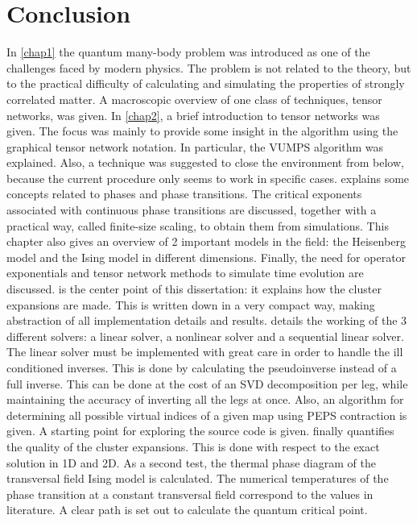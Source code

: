 \section{Conclusion}

In \cref{chap1} the quantum many-body problem was introduced as one of the challenges faced by modern physics. The problem is not related to the theory, but to the practical difficulty of calculating and simulating the properties of strongly correlated matter. A macroscopic overview of one class of techniques, tensor networks, was given.
In \cref{chap2}, a brief introduction to tensor networks was given. The focus was mainly to provide some insight in the algorithm using the graphical tensor network notation. In particular, the VUMPS algorithm was explained. Also, a technique was suggested to close the environment from below, because the current procedure only seems to work in specific cases.
 explains some concepts related to phases and phase transitions. The critical exponents associated with continuous phase transitions are discussed, together with a practical way, called finite-size scaling, to obtain them from simulations. This chapter also gives an overview of 2 important models in the field: the Heisenberg model and the Ising model in different dimensions. Finally, the need for operator exponentials and tensor network methods to simulate time evolution are discussed.
 is the center point of this dissertation: it explains how the cluster expansions are made. This is written down in a very compact way, making abstraction of all implementation details and results.
 details the working of the 3 different solvers: a linear solver, a nonlinear solver and a sequential linear solver. The linear solver must be implemented with great care in order to handle the ill conditioned inverses. This is done by calculating the pseudoinverse instead of a full inverse. This can be done at the cost of an SVD decomposition per leg, while maintaining the accuracy of inverting all the legs at once. Also, an algorithm for determining all possible virtual indices of a given map using PEPS contraction is given.  A starting point for exploring the source code is given.
 finally quantifies the quality of the cluster expansions. This is done with respect to the exact solution in 1D and 2D. As a second test, the thermal phase diagram of the transversal field Ising model is calculated. The numerical temperatures of the phase transition at a constant transversal field correspond to the values in literature. A clear path is set out to calculate the quantum critical point.

